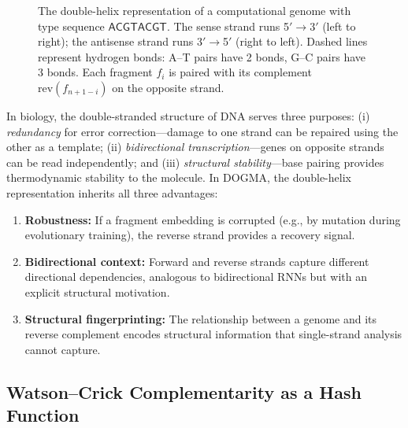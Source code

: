 \begin{figure}[t]
\caption{The double-helix representation of a computational genome with type sequence $\mathsf{ACGTACGT}$. The sense strand runs 5\('\to\)3\('\) (left to right); the antisense strand runs 3\('\to\)5\('\) (right to left). Dashed lines represent hydrogen bonds: A--T pairs have 2 bonds, G--C pairs have 3 bonds. Each fragment $f_i$ is paired with its complement $\mathrm{rev}(f_{n+1-i})$ on the opposite strand.}
\label{fig:double-helix-structure}
\end{figure}

\begin{bioinsight}
In biology, the double-stranded structure of DNA serves three purposes: (i) \emph{redundancy} for error correction---damage to one strand can be repaired using the other as a template; (ii) \emph{bidirectional transcription}---genes on opposite strands can be read independently; and (iii) \emph{structural stability}---base pairing provides thermodynamic stability to the molecule. In DOGMA, the double-helix representation inherits all three advantages:
\begin{enumerate}[leftmargin=1.5em]
  \item \textbf{Robustness:} If a fragment embedding is corrupted (e.g., by mutation during evolutionary training), the reverse strand provides a recovery signal.
  \item \textbf{Bidirectional context:} Forward and reverse strands capture different directional dependencies, analogous to bidirectional RNNs but with an explicit structural motivation.
  \item \textbf{Structural fingerprinting:} The relationship between a genome and its reverse complement encodes structural information that single-strand analysis cannot capture.
\end{enumerate}
\end{bioinsight}

\subsection{Watson--Crick Complementarity as a Hash Function}
\label{subsec:wc-hash}

